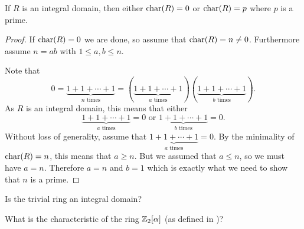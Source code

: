 \begin{proposition}\label{prop-zero-of-prime-characteristic-if-integral-domain}
    If $R$ is an integral domain, then either $\mathrm{char}(R) = 0$ or $\mathrm{char}(R) = p$ where $p$ is a prime.
\end{proposition}
\begin{proof}
    If $\mathrm{char}(R) = 0$ we are done, so assume that $\mathrm{char}(R) = n \neq 0$. Furthermore assume $n = ab$ with $1 \leq a,b \leq n$.

    Note that
    \[
        0 = \underbrace{1 + 1 + \cdots + 1}_{n \text{ times}} = (\underbrace{1+1+\cdots+1}_{a \text{ times}})(\underbrace{1+1+\cdots+1}_{b \text{ times}}).
    \]
    As $R$ is an integral domain, this means that either
    \[
        \underbrace{1+1+\cdots+1}_{a \text{ times}} = 0 \text{ or } \underbrace{1+1+\cdots+1}_{b \text{ times}} = 0.
    \]
    Without loss of generality, assume that $\underbrace{1+1+\cdots+1}_{a \text{ times}} = 0$. By the minimality of $\mathrm{char}(R) = n$, this means that $a \geq n$. But we assumed that $a \leq n$, so we must have $a = n$. Therefore $a = n$ and $b = 1$ which is exactly what we need to show that $n$ is a prime.
\end{proof}

\begin{exercise}\label{exercise-trivial-ring-is-not-an-integral-domain}
    Is the trivial ring an integral domain?
\end{exercise}
\begin{exercise}
    What is the characteristic of the ring $\mathbb{Z}_2[\alpha]$ (as defined in )?
\end{exercise}

